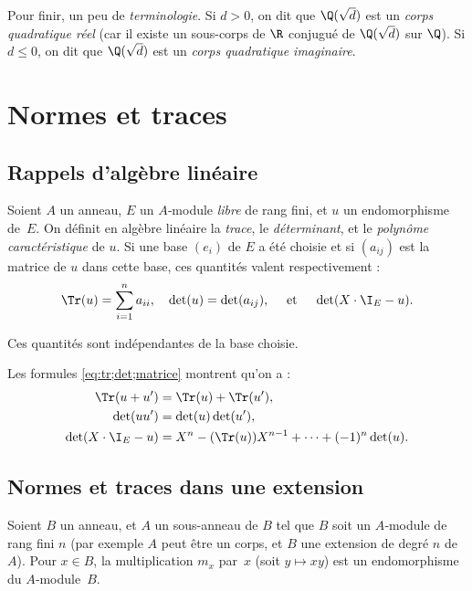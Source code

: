 \documentclass[11pt, %
  title in boldface,
  theorem in new line,
  theorem numbering = section,
  number theorems separately,
  simple name,
]{beaulivre}
\begin{document}
    Pour finir, un peu de \emph{terminologie}. Si \( d > 0 \), on dit que \( \Q(\sqrt{d}) \) est un \emph{corps quadratique réel} (car il existe un sous-corps de \( \R \) conjugué de \( \Q(\sqrt{d}) \) sur \( \Q \)). Si \( d \leqslant 0 \), on dit que \( \Q(\sqrt{d}) \) est un \emph{corps quadratique imaginaire}.

\section{Normes et traces}\label{sec:normes et traces}

\subsection{Rappels d'algèbre linéaire}
    Soient \( A \) un anneau, \( E \) un \( A \)‑module \emph{libre} de rang fini, et \( u \) un endomorphisme de~\( E \). On définit en algèbre linéaire la \emph{trace}, le \emph{déterminant}, et le \emph{polynôme caractéristique} de \( u \). Si une base \( (e_i) \) de \( E \) a été choisie et si \( (a_{ij}) \) est la matrice de \( u \) dans cette base, ces quantités valent respectivement :
    \begin{equation}\label{eq:tr;det;matrice}
        \Tr(u) = \sum_{i=1}^n a_{ii}, \quad
        \det(u) = \det(a_{ij}), \quad \text{ et } \quad
        \det(X\cdot \I_E - u).
    \end{equation}
    \begin{remark}
        Ces quantités sont indépendantes de la base choisie.
    \end{remark}

    Les formules \eqref{eq:tr;det;matrice} montrent qu'on a :
    \begin{align}\label{eq:tr;det;prop}
        \Tr(u+u') &= \Tr(u)+\Tr(u'),\nonumber\\
        \det(uu') &= \det(u)\det(u'),\\
        \det(X\cdot \I_E - u) &= X^n - (\Tr(u))X^{n-1} + \cdots + (-1)^n \det(u).\nonumber
    \end{align}

\subsection{Normes et traces dans une extension}
    Soient \( B \) un anneau, et \( A \) un sous-anneau de \( B \) tel que \( B \) soit un \( A \)‑module de rang fini \( n \) (par exemple \( A \) peut être un corps, et \( B \) une extension de degré \( n \) de~\( A \)). Pour \( x \in B \), la multiplication \( m_x \) par~\( x \) (soit \( y \mapsto xy \)) est un endomorphisme du \( A \)‑module~\( B \).
\end{document}
